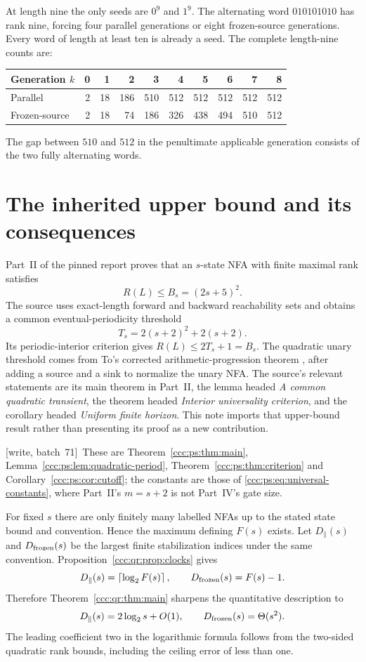 \documentclass[11pt,letterpaper]{article}
\theoremstyle{definition}
\theoremstyle{remark}
\newcommand{\clog}[1]{\left\lceil\log_2 #1\right\rceil}
\newcommand{\wsevone}{\textup{[write, batch~71]}}
\begin{document}
At length nine the only seeds are $0^9$ and $1^9$. The alternating word
$010101010$ has rank nine, forcing four parallel generations or eight
frozen-source generations. Every word of length at least ten is already a
seed. The complete length-nine counts are:
\begin{center}
\begin{tabular}{lrrrrrrrrr}
\toprule
Generation $k$ &0&1&2&3&4&5&6&7&8\\
\midrule
Parallel &2&18&186&510&512&512&512&512&512\\
Frozen-source &2&18&74&186&326&438&494&510&512\\
\bottomrule
\end{tabular}
\end{center}
The gap between $510$ and $512$ in the penultimate applicable generation
consists of the two fully alternating words.

\section{The inherited upper bound and its consequences}\label{ccc:qr:sec:upper}

Part~II of the pinned report proves that an $s$-state NFA with finite maximal
rank satisfies
\begin{equation}\label{ccc:qr:eq:upper}
R(L)\le B_s=(2s+5)^2.
\end{equation}
The source uses exact-length forward and backward reachability sets and
obtains a common eventual-periodicity threshold
\[
T_s=2(s+2)^2+2(s+2).
\]
Its periodic-interior criterion gives $R(L)\le2T_s+1=B_s$. The quadratic
unary threshold comes from To's corrected arithmetic-progression theorem
\cite[Section~3]{To}, after adding a source and a sink to normalize the unary
NFA. The source's relevant statements are its main theorem in Part~II, the
lemma headed \emph{A common quadratic transient}, the theorem headed
\emph{Interior universality criterion}, and the corollary headed
\emph{Uniform finite horizon}. This note imports that upper-bound result
rather than presenting its proof as a new contribution.

\wsevone\ These are Theorem~\ref{ccc:ps:thm:main},
Lemma~\ref{ccc:ps:lem:quadratic-period}, Theorem~\ref{ccc:ps:thm:criterion}
and Corollary~\ref{ccc:ps:cor:cutoff}; the constants are those of
\eqref{ccc:ps:eq:universal-constants}, where Part~II's $m=s+2$ is not
Part~IV's gate size.

For fixed $s$ there are only finitely many labelled NFAs up to the stated
state bound and convention. Hence the maximum defining $F(s)$ exists. Let
$D_\parallel(s)$ and $D_{\rm frozen}(s)$ be the largest finite stabilization
indices under the same convention. Proposition~\ref{ccc:qr:prop:clocks} gives
\[
D_\parallel(s)=\clog{F(s)},\qquad D_{\rm frozen}(s)=F(s)-1.
\]
Therefore Theorem~\ref{ccc:qr:thm:main} sharpens the quantitative description
to
\[
D_\parallel(s)=2\log_2 s+O(1),
\qquad
D_{\rm frozen}(s)=\Theta(s^2).
\]
The leading coefficient two in the logarithmic formula follows from the
two-sided quadratic rank bounds, including the ceiling error of less than
one.
\end{document}
